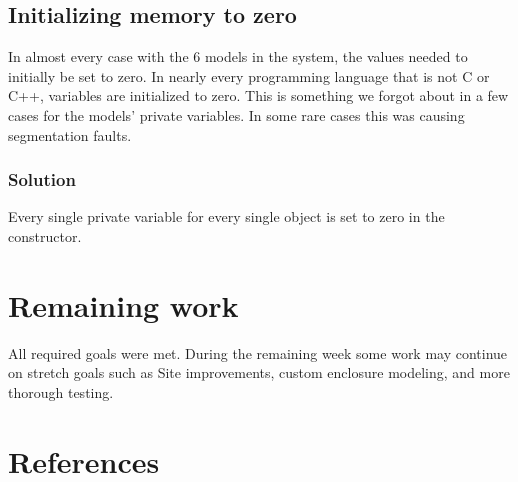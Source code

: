 \documentclass[onecolumn, draftclsnofoot,10pt, compsoc]{IEEEtran}
\begin{document}
		\subsection{Initializing memory to zero}
			In almost every case with the 6 models in the system, the values needed to initially be set to zero.
			In nearly every programming language that is not C or C++, variables are initialized to zero.
			This is something we forgot about in a few cases for the models' private variables.
			In some rare cases this was causing segmentation faults.

			\subsubsection{Solution}
				Every single private variable for every single object is set to zero in the constructor.


	\section{Remaining work}
	All required goals were met.
	During the remaining week some work may continue on stretch goals such as Site improvements, custom enclosure modeling, and more thorough testing.


	\section{References}
			\begingroup
				\renewcommand{\addcontentsline}[3]{}%
				\renewcommand{\section}[2]{}%
				
				
			\endgroup
\end{document}
